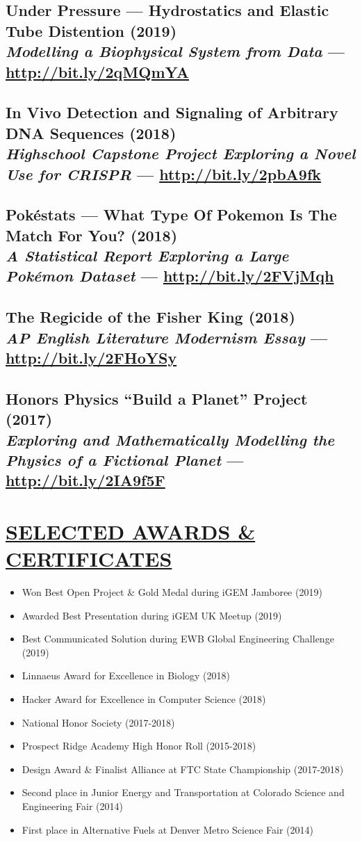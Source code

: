 \documentclass[twocolumn, a4paper, fontsize=9pt, headsepline, footsepline]{scrartcl}
\begin{document}
\subsection*{Under Pressure — Hydrostatics and Elastic Tube Distention
  (2019)\\\textmd{\emph{Modelling a Biophysical System from Data} — \url{http://bit.ly/2qMQmYA}}}
\subsection*{In Vivo Detection and Signaling of Arbitrary DNA Sequences
  (2018)\\\textmd{\emph{Highschool Capstone Project Exploring a Novel Use for
    CRISPR} — \url{http://bit.ly/2pbA9fk}}}
\subsection*{Pokéstats — What Type Of Pokemon Is The Match For You?
  (2018)\\\textmd{\emph{A Statistical Report Exploring a Large Pokémon Dataset} — \url{http://bit.ly/2FVjMqh}}}
\subsection*{The Regicide of the Fisher King (2018)\\\textmd{\emph{AP English
    Literature Modernism Essay} — \url{http://bit.ly/2FHoYSy}}}
\subsection*{Honors Physics “Build a Planet” Project (2017)\\\textmd{\emph{Exploring and
    Mathematically Modelling the Physics of a Fictional Planet} — \url{http://bit.ly/2IA9f5F}}}
\section*{\ul{SELECTED AWARDS \& CERTIFICATES}}
\begin{itemize}
\item Won Best Open Project \& Gold Medal during iGEM Jamboree (2019)
\item Awarded Best Presentation during iGEM UK Meetup (2019)
\item Best Communicated Solution during EWB Global Engineering Challenge (2019)
\item Linnaeus Award for Excellence in Biology (2018)
\item Hacker Award for Excellence in Computer Science (2018)
\item National Honor Society (2017-2018)
\item Prospect Ridge Academy High Honor Roll (2015-2018)
\item Design Award \& Finalist Alliance at FTC State Championship (2017-2018)
\item Second place in Junior Energy and Transportation at Colorado Science and
  Engineering Fair (2014)
\item First place in Alternative Fuels at Denver Metro Science Fair (2014)
\end{itemize}
\end{document}
